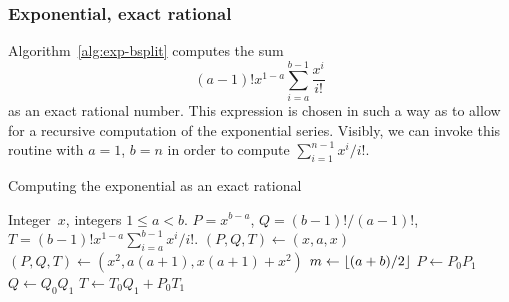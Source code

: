 \subsubsection{Exponential, exact rational}

Algorithm~\ref{alg:exp-bsplit} computes the sum 
\begin{equation}
(a-1)! x^{1-a} \sum_{i=a}^{b-1} \frac{x^i}{i!}
\end{equation}
as an exact rational number.  This expression is chosen in such a way 
as to allow for a recursive computation of the exponential series. 
Visibly, we can invoke this routine with $a = 1$, $b = n$ in order 
to compute $\sum_{i=1}^{n-1} x^i / i!$.

\begin{algorithm}
\caption{Computing the exponential as an exact rational}
\label{alg:exp-bsplit}
\begin{algorithmic}
\vspace{1mm}
\Require Integer~$x$, integers $1 \leq a < b$.
\Ensure  $P = x^{b-a}$, $Q = (b-1)! / (a-1)!$, $T = (b-1)! x^{1-a} \sum_{i=a}^{b-1} x^i / i!$.
\State $(P, Q, T) \gets (x, a, x)$
\State $(P, Q, T) \gets (x^2, a (a + 1), x (a + 1) + x^2)$
\Else
\State $m \gets \left\lfloor(a + b) / 2\right\rfloor$
\State {}
\State {}
\State $P \gets P_0 P_1$
\State $Q \gets Q_0 Q_1$
\State $T \gets T_0 Q_1 + P_0 T_1$
\EndIf
\EndProcedure
\end{algorithmic}
\end{algorithm}

